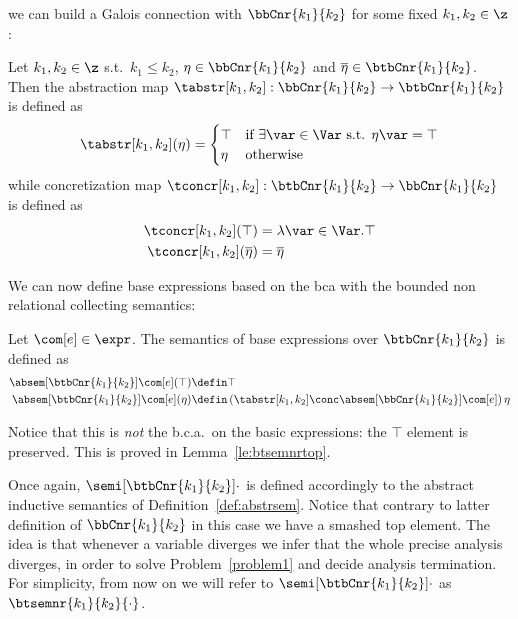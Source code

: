 we can build a Galois connection with \(\bbCnr{k_1}{k_2}\) for some
fixed \(k_1, k_2 \in \z\):

\begin{definition}
  Let \(k_1, k_2 \in \z\) s.t.\ \(k_1 \leq k_2\),
  \(\eta \in \bbCnr{k_1}{k_2}\) and
  \(\overline\eta \in \btbCnr{k_1}{k_2}\). Then the abstraction map
  \({\tabstr[k_1,k_2]} : \bbCnr{k_1}{k_2} \to \btbCnr{k_1}{k_2}\) is
  defined as
  \begin{equation*}
    {\tabstr[k_1,k_2]}(\eta) = \begin{cases}
      \top & \text{if } \exists\var\in\Var \text{ s.t. } \eta\var = \top \\
      \eta & \text{otherwise}
    \end{cases}
  \end{equation*}
  while concretization map
  \({\tconcr[k_1,k_2]} : \btbCnr{k_1}{k_2} \to \bbCnr{k_1}{k_2}\)
  is defined as
  \begin{align*}
    \tconcr[k_1,k_2](\top) & = \lambda \var \in \Var . \top \\
    \tconcr[k_1,k_2](\overline\eta) & = \overline\eta
  \end{align*}
\end{definition}

We can now define base expressions based on the bca with the bounded
non relational collecting semantics:

\begin{definition}\label{def:boundedtop}
  Let \(\com[e] \in \expr\). The semantics of base expressions over
  \(\btbCnr{k_1}{k_2}\) is defined as
  \begin{align*}
    \absem[\btbCnr{k_1}{k_2}]{\com[e]}(\top) \defin & \top \\
    \absem[\btbCnr{k_1}{k_2}]{\com[e]}(\eta) \defin & \left({\tabstr[k_1,k_2]}\conc \absem[\bbCnr{k_1}{k_2}]{\com[e]}\right)\eta
  \end{align*}
\end{definition}
Notice that this is \emph{not} the b.c.a.\ on the basic expressions:
the \(\top\) element is preserved. This is proved in
Lemma~\ref{le:btsemnrtop}.

Once again, \(\semi[\btbCnr{k_1}{k_2}]{\cdot}\) is defined accordingly
to the abstract inductive semantics of Definition~\ref{def:abstrsem}.
Notice that contrary to latter definition of \(\bbCnr{k_1}{k_2}\) in
this case we have a smashed top element. The idea is that whenever a
variable diverges we infer that the whole precise analysis diverges,
in order to solve Problem~\ref{problem1} and decide analysis
termination.  For simplicity, from now on we will refer to
\(\semi[\btbCnr{k_1}{k_2}]{\cdot}\) as \(\btsemnr{k_1}{k_2}{\cdot}\).


